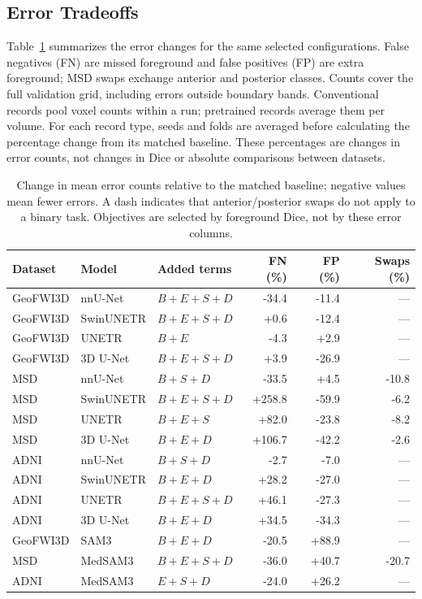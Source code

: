 \documentclass[12pt,a4paper]{article}
\begin{document}
\subsection{Error Tradeoffs}
\label{sec:complete-error-tables}
Table~\ref{tab:selected-error-tradeoffs} summarizes the error changes
for the same selected configurations. False negatives (FN) are missed
foreground and false positives (FP) are extra foreground; MSD swaps
exchange anterior and posterior classes. Counts cover the full validation
grid, including errors outside boundary bands. Conventional records pool
voxel counts within a run; pretrained records average them per volume.
For each record type, seeds and folds are averaged before calculating
the percentage change from its matched baseline. These percentages are
changes in error counts, not changes in Dice or absolute comparisons
between datasets.

\begin{table}[htbp]
\centering\footnotesize{}
\setlength{\tabcolsep}{4pt}\renewcommand{\arraystretch}{1.15}
\begin{tabular}{@{}lllrrr@{}}
\hline
Dataset & Model & Added terms & FN (\%) & FP (\%) & Swaps (\%) \\
\hline
GeoFWI3D & nnU-Net & $B+E+S+D$ & -34.4 & -11.4 & --- \\
GeoFWI3D & SwinUNETR & $B+E+S+D$ & +0.6 & -12.4 & --- \\
GeoFWI3D & UNETR & $B+E$ & -4.3 & +2.9 & --- \\
GeoFWI3D & 3D U-Net & $B+E+S+D$ & +3.9 & -26.9 & --- \\
MSD & nnU-Net & $B+S+D$ & -33.5 & +4.5 & -10.8 \\
MSD & SwinUNETR & $B+E+S+D$ & +258.8 & -59.9 & -6.2 \\
MSD & UNETR & $B+E+S$ & +82.0 & -23.8 & -8.2 \\
MSD & 3D U-Net & $B+E+D$ & +106.7 & -42.2 & -2.6 \\
ADNI & nnU-Net & $B+S+D$ & -2.7 & -7.0 & --- \\
ADNI & SwinUNETR & $B+E+D$ & +28.2 & -27.0 & --- \\
ADNI & UNETR & $B+E+S+D$ & +46.1 & -27.3 & --- \\
ADNI & 3D U-Net & $B+E+D$ & +34.5 & -34.3 & --- \\
GeoFWI3D & SAM3 & $B+E+D$ & -20.5 & +88.9 & --- \\
MSD & MedSAM3 & $B+E+S+D$ & -36.0 & +40.7 & -20.7 \\
ADNI & MedSAM3 & $E+S+D$ & -24.0 & +26.2 & --- \\
\hline
\end{tabular}
\caption{Change in mean error counts relative to the matched baseline; negative values mean fewer errors. A dash indicates that anterior/posterior swaps do not apply to a binary task. Objectives are selected by foreground Dice, not by these error columns.}
\label{tab:selected-error-tradeoffs}
\end{table}
\end{document}
